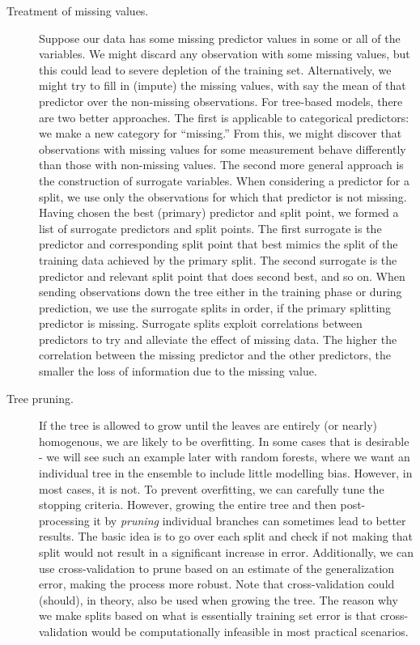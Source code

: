 \begin{refsection}
\begin{description}
\item[Treatment of missing values.] Suppose our data has some missing predictor values in some or all of the variables. We might discard any observation with some missing values, but this could lead to severe depletion of the training set. Alternatively, we might try to fill in (impute) the missing values, with say the mean of that predictor over the non-missing observations. For tree-based models, there are two better approaches. The first is applicable to categorical predictors: we make a new category for “missing.” From this, we might discover that observations with missing values for some measurement behave differently than those with non-missing values. The second more general approach is the construction of surrogate variables. When considering a predictor for a split, we use only the observations for which that predictor is not missing. Having chosen the best (primary) predictor and split point, we formed a list of surrogate predictors and split points. The first surrogate is the predictor and corresponding split point that best mimics the split of the training data achieved by the primary split. The second surrogate is the predictor and relevant split point that does second best, and so on. When sending observations down the tree either in the training phase or during prediction, we use the surrogate splits in order, if the primary splitting predictor is missing. Surrogate splits exploit correlations between predictors to try and alleviate the effect of missing data. The higher the correlation between the missing predictor and the other predictors, the smaller the loss of information due to the missing value.

\item[Tree pruning.] If the tree is allowed to grow until the leaves are entirely (or nearly) homogenous, we are likely to be overfitting. In some cases that is desirable - we will see such an example later with random forests, where we want an individual tree in the ensemble to include little modelling bias. However, in most cases, it is not. To prevent overfitting, we can carefully tune the stopping criteria. However, growing the entire tree and then post-processing it by {\em pruning} individual branches can sometimes lead to better results. The basic idea is to go over each split and check if not making that split would not result in a significant increase in error.
Additionally, we can use cross-validation to prune based on an estimate of the generalization error, making the process more robust. Note that cross-validation could (should), in theory, also be used when growing the tree. The reason why we make splits based on what is essentially training set error is that cross-validation would be computationally infeasible in most practical scenarios.


\end{description}
\end{refsection}
